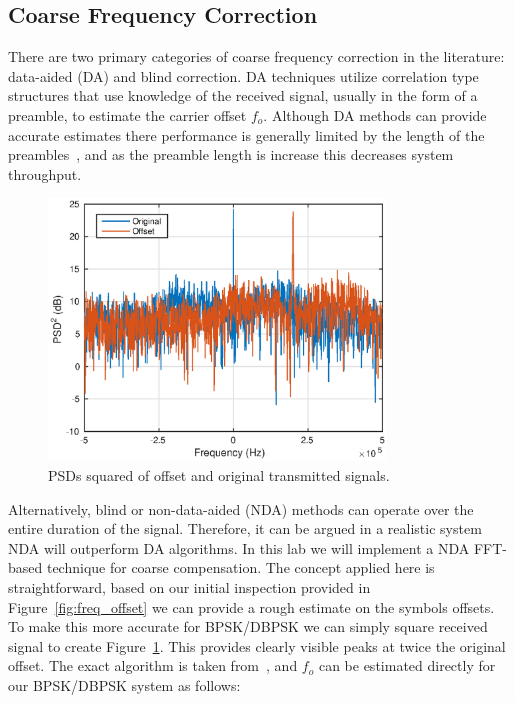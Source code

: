 \documentclass[letterpaper,12pt]{article}
\begin{document}
\subsection{Coarse Frequency Correction}\label{sec:cfo}
%
There are two primary categories of coarse frequency correction in the literature: data-aided (DA) and blind 
correction.  DA techniques utilize correlation type structures that use knowledge of the received 
signal, usually in the form of a preamble, to estimate the carrier offset $f_o$.  Although DA methods can 
provide accurate estimates there performance is generally limited by the length of the 
preambles~\cite{morelli1998}, and as the preamble length is increase this decreases system throughput.\par
%
\begin{figure}[!htp]
 \centering
  \includegraphics[width=0.8\textwidth]{freqOffsetSquared.eps}
  \caption{PSDs squared of offset and original transmitted signals.}\label{fig:freq_offset_squared}
\end{figure}
%
Alternatively, blind or non-data-aided (NDA) methods can operate over the entire duration of the signal.  
Therefore, it can be argued in a realistic system NDA will outperform DA algorithms.  In this lab we will 
implement a NDA FFT-based technique for coarse compensation.  The concept applied here is straightforward, based on our initial inspection provided in Figure~\ref{fig:freq_offset} we can provide a rough estimate on the symbols offsets.  To make this more accurate for BPSK/DBPSK we can simply square received signal to create Figure~\ref{fig:freq_offset_squared}.  This provides clearly visible peaks at twice the original offset.  The exact algorithm is taken from~\cite{Wang2004}, and $f_o$ can be estimated directly for our BPSK/DBPSK system as follows:
\end{document}
